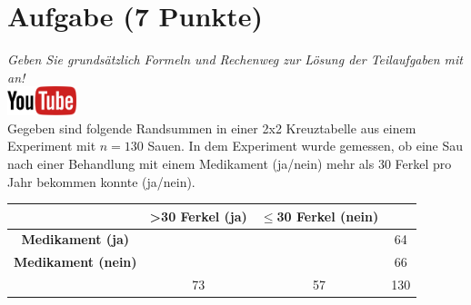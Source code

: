 \documentclass[a4paper, 9pt]{scrartcl}\usepackage[]{graphicx}\usepackage[]{xcolor}
\begin{document}
\section{Aufgabe \hfill (7 Punkte)}

\textit{Geben Sie grunds{\"a}tzlich Formeln und Rechenweg zur L{\"o}sung der
  Teilaufgaben mit an!} \\[1Ex]

\hfill\href{https://youtu.be/jakM7fHyZfU}{\includegraphics[width =
  2cm]{img/youtube}}\\[1Ex]




Gegeben sind folgende Randsummen in einer 2x2 Kreuztabelle aus einem
Experiment mit $n = 130$ Sauen. In dem Experiment wurde gemessen,
ob eine Sau nach einer Behandlung mit einem Medikament (ja/nein)
mehr als 30 Ferkel pro Jahr bekommen konnte (ja/nein).

\vspace{5Ex}

\begin{center}
  \Large
  \begin{tabular}{c|c|c|c}
     & \textbf{>30 Ferkel (ja)} & \textbf{$\leq$30 Ferkel (nein)} &  \strut\\
    \hline
    \textbf{Medikament (ja)} & \phantom{100}  & \phantom{100}  &   64  \strut\\
    \hline
    \textbf{Medikament (nein)} & \phantom{100}  & \phantom{100}  &   66   \strut\\
    \hline
     &  73 &  57 &  130  \strut\\
  \end{tabular}
\end{center}



\vspace{5Ex}
\end{document}

